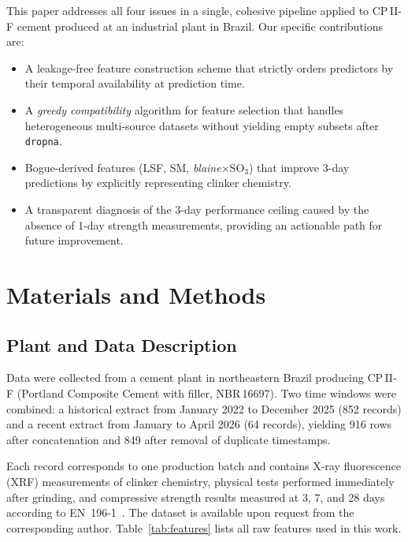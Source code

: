 \documentclass[preprint,12pt]{elsarticle}
\begin{document}
This paper addresses all four issues in a single, cohesive pipeline applied to
CP\,II-F cement produced at an industrial plant in Brazil.
Our specific contributions are:

\begin{itemize}
  \item A leakage-free feature construction scheme that strictly orders
        predictors by their temporal availability at prediction time.
  \item A \emph{greedy compatibility} algorithm for feature selection that
        handles heterogeneous multi-source datasets without yielding empty
        subsets after \texttt{dropna}.
  \item Bogue-derived features (LSF, SM, \textit{blaine}$\times$SO$_3$) that
        improve 3-day predictions by explicitly representing clinker chemistry.
  \item A transparent diagnosis of the 3-day performance ceiling caused by the
        absence of 1-day strength measurements, providing an actionable path
        for future improvement.
\end{itemize}

\section{Materials and Methods}
\label{sec:methods}

\subsection{Plant and Data Description}
\label{sec:data}

Data were collected from a cement plant in northeastern Brazil producing
CP\,II-F (Portland Composite Cement with filler, NBR\,16697).
Two time windows were combined: a historical extract from January 2022 to
December 2025 (852 records) and a recent extract from January to April 2026
(64 records), yielding 916 rows after concatenation and 849 after removal of
duplicate timestamps.

Each record corresponds to one production batch and contains X-ray fluorescence
(XRF) measurements of clinker chemistry, physical tests performed immediately
after grinding, and compressive strength results measured at 3, 7, and 28 days
according to EN~196-1~\cite{en196}.
The dataset is available upon request from the corresponding author.
Table~\ref{tab:features} lists all raw features used in this work.
\end{document}
